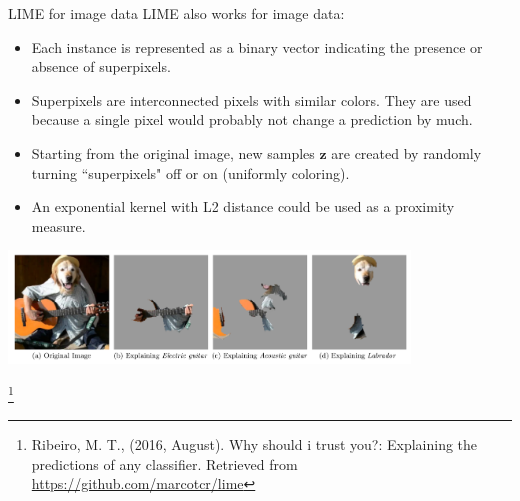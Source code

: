 \documentclass[11pt,compress,t,notes=noshow, xcolor=table]{beamer}
\newcommand{\zv}{\mathbf{z}}
\begin{document}
	\begin{vbframe}{LIME for image data}
	LIME also works for image data:  
	\begin{itemize}
		\item Each instance is represented as a binary vector indicating the presence or absence of superpixels. 
		\item Superpixels are interconnected pixels with similar colors. They are used because a single pixel would probably not change a prediction by much.
		\item Starting from the original image, new samples $\zv$ are created by randomly turning ``superpixels" off or on (uniformly coloring). 
		\item An exponential kernel with L2 distance could be used as a proximity measure.
	\end{itemize}
	\vspace{-0.3cm}
	\begin{center}
		\includegraphics[width=0.8\textwidth]{figure/lime-images}
	\end{center}
	\vspace{-0.3cm}
	\footnote[frame]{Ribeiro, M. T., (2016, August). Why should i trust you?: Explaining the predictions of any classifier. Retrieved from \url{https://github.com/marcotcr/lime}}
\end{vbframe}

\endlecture
\end{document}
